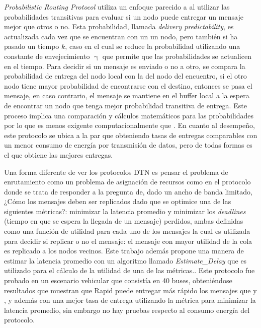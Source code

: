 \prophet{} \cite{lindgren_probabilistic_2003} \textit{Probabilistic Routing
Protocol} utiliza un enfoque parecido a \maxprop{} al utilizar las
probabilidades transitivas para evaluar si un nodo puede entregar un mensaje
mejor que otros o no. Esta probabilidad, llamada \textit{delivery
predictability}, es actualizada cada vez que se encuentran con un un nodo, pero
también si ha pasado un tiempo $k$, caso en el cual se reduce la probabilidad
utilizando una constante de envejecimiento $\upgamma$ que permite que las
probabilidades se actualicen en el tiempo. Para decidir si un mensaje es enviado
o no a otro, se compara la probabilidad de entrega del nodo local con la del
nodo del encuentro, si el otro nodo tiene mayor probabilidad de encontrarse con
el destino, entonces se pasa el mensaje, en caso contrario, el mensaje se
mantiene en el buffer local a la espera de encontrar un nodo que tenga mejor
probabilidad transitiva de entrega.  Este proceso implica una comparación y
cálculos matemáticos para las probabilidades por lo que es menos exigente
computacionalmente que \maxprop{}.  En cuanto al desempeño, este protocolo se
ubica a la par que \maxprop{} obteniendo tasas de entregas comparables con un
menor consumo de energía por transmisión de datos, pero de todas formas es
\maxprop{} el que obtiene las mejores entregas.


Una forma diferente de ver los protocolos DTN es pensar el problema de
enrutamiento como un problema de asignación de recursos como en el protocolo
\rapid{} \cite{rapid} donde se trata de responder a la pregunta de, dado un
ancho de banda limitado, ¿Cómo los mensajes deben ser replicados dado que se
optimice una de las siguientes métricas?: minimizar la latencia promedio y
minimizar los \textit{deadlines} (tiempo en que se espera la llegada de un
mensaje) perdidos, ambas definidas como una función de utilidad para
cada uno de los mensajes la cual es utilizada para decidir si replicar o no el
mensaje: el mensaje con mayor utilidad de la cola es replicado a los nodos
vecinos. Este trabajo además propone una manera de estimar la latencia promedio
con un algoritmo llamado \textit{Estimate\_Delay} que es utilizado para el
cálculo de la utilidad de una de las métricas.. Este protocolo fue probado en un
escenario vehicular que consistía en 40 buses, obteniéndose resultados que
muestran que Rapid puede entregar más rápido los mensajes que \maxprop{} y \syw,
y además con una mejor tasa de entrega utilizando la métrica para minimizar la
latencia promedio, sin embargo no hay pruebas respecto al
consumo energía del protocolo.


